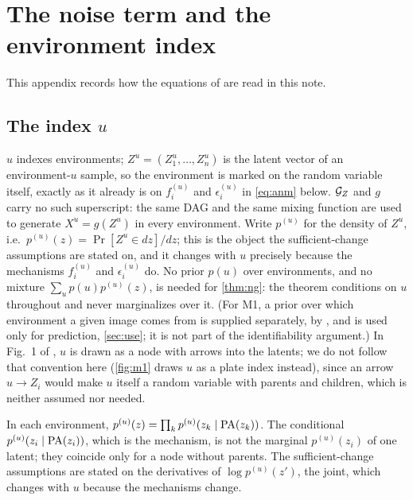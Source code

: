 \section{The noise term and the environment index}
\label{app:eps}

This appendix records how the equations of \cite{ng2025} are read in this note.

\subsection{The index \texorpdfstring{$u$}{u}}
$u$ indexes environments; $Z^u=(Z_1^u,\dots,Z_n^u)$ is the latent vector of an environment-$u$ sample, so
the environment is marked on the random variable itself, exactly as it already is on $f_i^{(u)}$ and
$\epsilon_i^{(u)}$ in \cref{eq:anm} below. $\mathcal{G}_Z$ and $g$ carry no such superscript: the same DAG
and the same mixing function are used to generate $X^u=g(Z^u)$ in every environment. Write $p^{(u)}$ for
the density of $Z^u$, i.e.\ $p^{(u)}(z)=\Pr[Z^u\in dz]/dz$; this is the object the sufficient-change
assumptions are stated on, and it changes with $u$ precisely because the mechanisms $f_i^{(u)}$ and
$\epsilon_i^{(u)}$ do. No prior $p(u)$ over environments, and no mixture $\sum_u p(u)p^{(u)}(z)$, is
needed for \cref{thm:ng}: the theorem conditions on $u$ throughout and never marginalizes over it. (For
M1, a prior over which environment a given image comes from is supplied separately, by
, and is used only for prediction, \cref{sec:use}; it is not part of the
identifiability argument.) In Fig.~1 of \cite{ng2025}, $u$ is drawn as a node with arrows into the
latents; we do not follow that convention here (\cref{fig:m1} draws $u$ as a plate index instead), since
an arrow $u\to Z_i$ would make $u$ itself a random variable with parents and children, which is neither
assumed nor needed.

In each environment, $p^{(u)}(z)=\prod_k p^{(u)}(z_k\mid\mathrm{PA}(z_k))$. The conditional
$p^{(u)}(z_i\mid\mathrm{PA}(z_i))$, which is the mechanism, is not the marginal $p^{(u)}(z_i)$ of one latent;
they coincide only for a node without parents. The sufficient-change assumptions are stated on the
derivatives of $\log p^{(u)}(z')$, the joint, which changes with $u$ because the mechanisms change.


